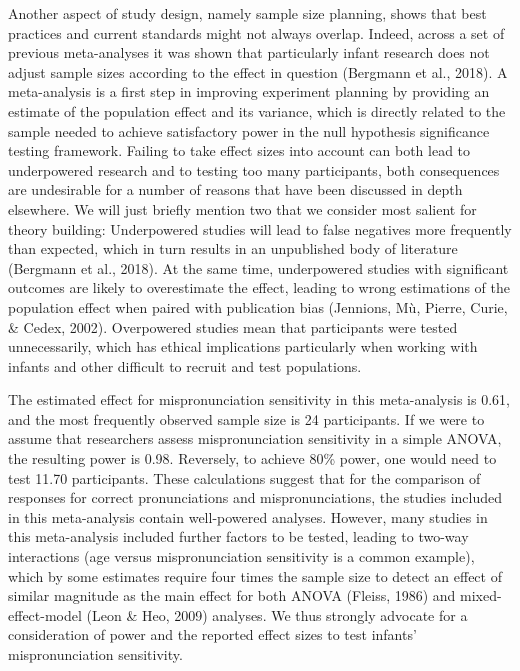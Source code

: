 \documentclass[man]{apa6}
\theoremstyle{definition}
\theoremstyle{definition}
\theoremstyle{definition}
\theoremstyle{remark}
\begin{document}
Another aspect of study design, namely sample size planning, shows that
best practices and current standards might not always overlap. Indeed,
across a set of previous meta-analyses it was shown that particularly
infant research does not adjust sample sizes according to the effect in
question (Bergmann et al., 2018). A meta-analysis is a first step in
improving experiment planning by providing an estimate of the population
effect and its variance, which is directly related to the sample needed
to achieve satisfactory power in the null hypothesis significance
testing framework. Failing to take effect sizes into account can both
lead to underpowered research and to testing too many participants, both
consequences are undesirable for a number of reasons that have been
discussed in depth elsewhere. We will just briefly mention two that we
consider most salient for theory building: Underpowered studies will
lead to false negatives more frequently than expected, which in turn
results in an unpublished body of literature (Bergmann et al., 2018). At
the same time, underpowered studies with significant outcomes are likely
to overestimate the effect, leading to wrong estimations of the
population effect when paired with publication bias (Jennions, Mù,
Pierre, Curie, \& Cedex, 2002). Overpowered studies mean that
participants were tested unnecessarily, which has ethical implications
particularly when working with infants and other difficult to recruit
and test populations.

The estimated effect for mispronunciation sensitivity in this
meta-analysis is 0.61, and the most frequently observed sample size is
24 participants. If we were to assume that researchers assess
mispronunciation sensitivity in a simple ANOVA, the resulting power is
0.98. Reversely, to achieve 80\% power, one would need to test 11.70
participants. These calculations suggest that for the comparison of
responses for correct pronunciations and mispronunciations, the studies
included in this meta-analysis contain well-powered analyses. However,
many studies in this meta-analysis included further factors to be
tested, leading to two-way interactions (age versus mispronunciation
sensitivity is a common example), which by some estimates require four
times the sample size to detect an effect of similar magnitude as the
main effect for both ANOVA (Fleiss, 1986) and mixed-effect-model (Leon
\& Heo, 2009) analyses. We thus strongly advocate for a consideration of
power and the reported effect sizes to test infants' mispronunciation
sensitivity.
\end{document}
